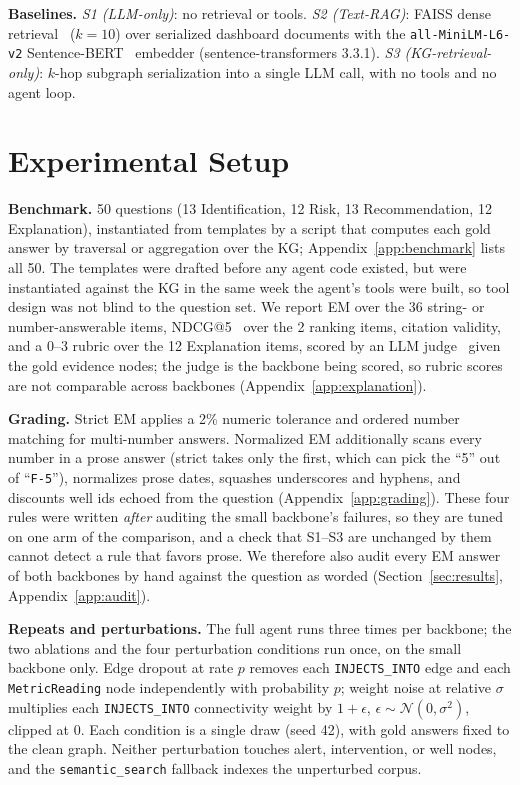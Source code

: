\documentclass{article}
\begin{document}
\textbf{Baselines.} \emph{S1 (LLM-only)}: no retrieval or tools. \emph{S2
(Text-RAG)}: FAISS dense retrieval~\cite{dpr2020} ($k{=}10$) over serialized
dashboard documents with the \texttt{all-MiniLM-L6-v2}
Sentence-BERT~\cite{sbert2019} embedder (sentence-transformers 3.3.1).
\emph{S3 (KG-retrieval-only)}: $k$-hop subgraph serialization into a single
LLM call, with no tools and no agent loop.

\section{Experimental Setup}

\textbf{Benchmark.} 50 questions (13 Identification, 12 Risk, 13
Recommendation, 12 Explanation), instantiated from templates by a script that
computes each gold answer by traversal or aggregation over the KG;
Appendix~\ref{app:benchmark} lists all 50. The templates were drafted before
any agent code existed, but were instantiated against the KG in the same week
the agent's tools were built, so tool design was not blind to the question
set. We report EM over the 36 string- or number-answerable items, NDCG@5~\cite{ndcg2002}
over the 2 ranking items, citation validity, and a 0--3 rubric over the 12
Explanation items, scored by an LLM judge~\cite{llmjudge2023} given the gold
evidence nodes; the judge is the backbone being scored, so rubric scores are
not comparable across backbones (Appendix~\ref{app:explanation}).

\textbf{Grading.} Strict EM applies a 2\% numeric tolerance and ordered
number matching for multi-number answers. Normalized EM additionally scans
every number in a prose answer (strict takes only the first, which can pick
the ``5'' out of ``\texttt{F-5}''), normalizes prose dates, squashes
underscores and hyphens, and discounts well ids echoed from the question
(Appendix~\ref{app:grading}). These four rules were written \emph{after}
auditing the small backbone's failures, so they are tuned on one arm of the
comparison, and a check that S1--S3 are unchanged by them cannot detect a rule
that favors prose. We therefore also audit every EM answer of both backbones by
hand against the question as worded (Section~\ref{sec:results},
Appendix~\ref{app:audit}).

\textbf{Repeats and perturbations.} The full agent runs three times per
backbone; the two ablations and the four perturbation conditions run once, on
the small backbone only. Edge dropout at rate $p$ removes each
\texttt{INJECTS\_INTO} edge and each \texttt{MetricReading} node independently
with probability $p$; weight noise at relative $\sigma$ multiplies each
\texttt{INJECTS\_INTO} connectivity weight by $1+\epsilon$,
$\epsilon \sim \mathcal{N}(0,\sigma^2)$, clipped at 0. Each condition is a
single draw (seed 42), with gold answers fixed to the clean graph. Neither
perturbation touches alert, intervention, or well nodes, and the
\texttt{semantic\_search} fallback indexes the unperturbed corpus.
\end{document}
